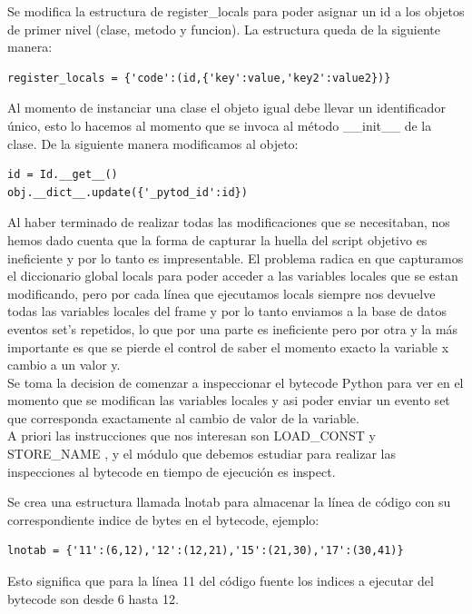 \documentclass[10pt,a4paper]{article}
\begin{document}
Se modifica la estructura de register\_locals para poder asignar un id a los objetos de primer nivel (clase, metodo y funcion).  La estructura queda de la siguiente manera:

\begin{verbatim}
register_locals = {'code':(id,{'key':value,'key2':value2})}
\end{verbatim}

Al momento de instanciar una clase el objeto igual debe llevar un identificador único, esto lo hacemos al momento que se invoca al método \_\_init\_\_ de la clase.  De la siguiente manera modificamos al objeto:

\begin{verbatim}
id = Id.__get__()
obj.__dict__.update({'_pytod_id':id})
\end{verbatim}

Al haber terminado de realizar todas las modificaciones que se necesitaban, nos hemos dado cuenta que la forma de capturar la huella del script objetivo es ineficiente y por lo tanto es impresentable.  El problema radica en que capturamos el diccionario global locals para poder acceder a las variables locales que se estan modificando, pero por cada línea que ejecutamos locals siempre nos devuelve todas las variables locales del frame y por lo tanto enviamos a la base de datos eventos set's repetidos, lo que por una parte es ineficiente pero por otra y la más importante es que se pierde el control de saber el momento exacto la variable x cambio a un valor y.\\

Se toma la decision de comenzar a inspeccionar el bytecode Python para ver en el momento que se modifican las variables locales y asi poder enviar un evento set que corresponda exactamente al cambio de valor de la variable.\\

A priori las instrucciones que nos interesan son LOAD\_CONST y STORE\_NAME \cite{bytecode}, y el módulo que debemos estudiar para realizar las inspecciones al bytecode en tiempo de ejecución es inspect.

Se crea una estructura llamada lnotab para almacenar la línea de código con su correspondiente indice de bytes en el bytecode, ejemplo:

\begin{verbatim}
lnotab = {'11':(6,12),'12':(12,21),'15':(21,30),'17':(30,41)}
\end{verbatim}

Esto significa que para la línea 11 del código fuente los indices a ejecutar del bytecode son desde 6 hasta 12.
\end{document}
